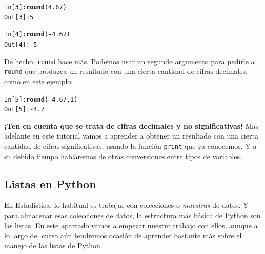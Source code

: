 \documentclass[10pt,a4paper]{article}\usepackage[]{graphicx}\usepackage[]{color}
\makeatletter
\newcommand{\hlnum}[1]{\textcolor[rgb]{0.686,0.059,0.569}{#1}}%
\newcommand{\hlopt}[1]{\textcolor[rgb]{0,0,0}{#1}}%
\newcommand{\hlstd}[1]{\textcolor[rgb]{0.345,0.345,0.345}{#1}}%
\newcommand{\hlkwd}[1]{\textcolor[rgb]{0.737,0.353,0.396}{\textbf{#1}}}%
\newenvironment{kframe}{%
 \def\at@end@of@kframe{}%
 \ifinner\ifhmode%
  \def\at@end@of@kframe{\end{minipage}}%
  \begin{minipage}{\columnwidth}%
 \fi\fi%
 \def\FrameCommand##1{\hskip\@totalleftmargin \hskip-\fboxsep
 \colorbox{shadecolor}{##1}\hskip-\fboxsep
     \hskip-\linewidth \hskip-\@totalleftmargin \hskip\columnwidth}%
 \MakeFramed {\advance\hsize-\width
   \@totalleftmargin\z@ \linewidth\hsize
   \@setminipage}}%
 {\par\unskip\endMakeFramed%
 \at@end@of@kframe}
\newenvironment{knitrout}{}{} %
\makeatother
\begin{document}
\begin{knitrout}
\color{fgcolor}\begin{kframe}
\begin{alltt}
\hlstd{In [}\hlnum{3}\hlstd{]}\hlopt{:} \hlkwd{round}\hlstd{(}\hlnum{4.67}\hlstd{)}
\hlstd{Out[}\hlnum{3}\hlstd{]}\hlopt{:} \hlnum{5}

\hlstd{In [}\hlnum{4}\hlstd{]}\hlopt{:} \hlkwd{round}\hlstd{(}\hlopt{-}\hlnum{4.67}\hlstd{)}
\hlstd{Out[}\hlnum{4}\hlstd{]}\hlopt{: -}\hlnum{5}
\end{alltt}
\end{kframe}
\end{knitrout}
De hecho, {\tt round} hace más. Podemos usar un segundo argumento para pedirle a {\tt round} que produzca un resultado con una cierta cantidad de cifras decimales, como en este ejemplo:
\begin{knitrout}
\color{fgcolor}\begin{kframe}
\begin{alltt}
\hlstd{In [}\hlnum{5}\hlstd{]}\hlopt{:} \hlkwd{round}\hlstd{(}\hlopt{-}\hlnum{4.67}\hlstd{,} \hlnum{1}\hlstd{)}
\hlstd{Out[}\hlnum{5}\hlstd{]}\hlopt{: -}\hlnum{4.7}
\end{alltt}
\end{kframe}
\end{knitrout}
{\bf ¡Ten en cuenta que se trata de cifras decimales y no significativas!} Más adelante en este tutorial vamos a aprender a obtener un resultado con una cierta cantidad de cifras significativas, usando la función {\tt print} que ya conocemos. Y a su debido tiempo hablaremos de otras conversiones entre tipos de variables.

\subsection{Listas en Python}
\label{tut02:subsec:listasPython}

En Estadística, lo habitual es trabajar con colecciones o {\em muestras} de datos. Y para almacenar esas colecciones de datos, la estructura más básica de Python son las listas. En este apartado vamos a empezar nuestro trabajo con ellos, aunque a lo largo del curso aún tendremos ocasión de aprender bastante más sobre el manejo de las listas de Python.
\end{document}

